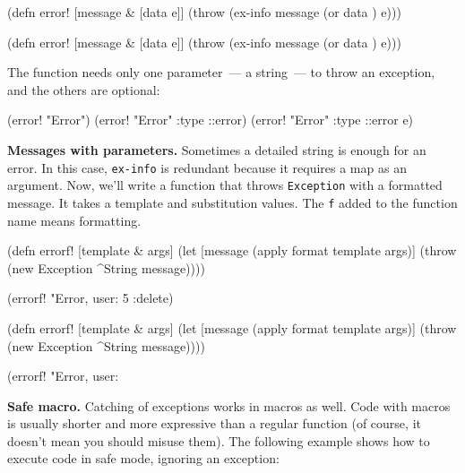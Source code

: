 
\ifnarrow

\begin{clojure}
(defn error! [message & [data e]]
  (throw (ex-info message
           (or data {}) e)))
\end{clojure}

\else

\begin{clojure}
(defn error! [message & [data e]]
  (throw (ex-info message (or data {}) e)))
\end{clojure}

\fi

\noindent
The function needs only one parameter~--- a string~--- to throw an exception, and the others are optional:

\begin{clojure}
(error! "Error")
(error! "Error" {:type ::error})
(error! "Error" {:type ::error} e)
\end{clojure}

\textbf{ Messages with parameters.} Sometimes a detailed string is enough for an error. In this case, \verb|ex-info| is redundant because it requires a map as an argument. Now, we'll write a function that throws \verb|Exception| with a formatted message. It takes a template and substitution values.
The \verb|f| added to the function name means formatting.


\ifnarrow

\begin{clojure}
(defn errorf! [template & args]
  (let [message (apply format
                  template args)]
    (throw (new Exception
             ^String message))))

(errorf! "Error, user: %
  5 :delete)
\end{clojure}

\else

\begin{clojure}
(defn errorf! [template & args]
  (let [message (apply format template args)]
    (throw (new Exception ^String message))))

(errorf! "Error, user: %
\end{clojure}

\fi

\textbf{Safe macro.} Catching of exceptions works in macros as well. Code with macros is usually shorter and more expressive than a regular function (of course, it doesn't mean you should misuse them). The following example shows how to execute code in safe mode, ignoring an exception:

